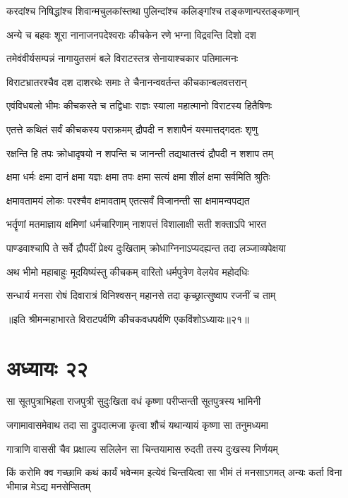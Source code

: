 \twolineshloka
{करदांश्च निषिद्धांश्च शिवान्मचुलकांस्तथा}
{पुलिन्दांश्च कलिङ्गांश्च तङ्कणान्परतङ्कणान्}


\twolineshloka
{अन्ये च बहवः शूरा नानाजनपदेश्वराः}
{कीचकेन रणे भग्ना विद्रवन्ति दिशो दश}


\twolineshloka
{तमेवंवीर्यसम्पन्नं नागायुतसमं बले}
{विराटस्तत्र सेनायाश्चकार पतिमात्मनः}


\twolineshloka
{विराटभ्रातरश्चैव दश दाशरथेः समाः}
{ते चैनानन्ववर्तन्त कीचकान्बलवत्तरान्}


\twolineshloka
{एवंविधबलो भीमः कीचकस्ते च तद्विधाः}
{राज्ञः स्याला महात्मानो विराटस्य हितैषिणः}


\twolineshloka
{एतत्ते कथितं सर्वं कीचकस्य पराक्रमम्}
{द्रौपदी न शशापैनं यस्मात्तद्गदतः शृणु}


\twolineshloka
{रक्षन्ति हि तपः क्रोधादृषयो न शपन्ति च}
{जानन्ती तद्यथातत्त्वं द्रौपदी न शशाप तम्}


\twolineshloka
{क्षमा धर्मः क्षमा दानं क्षमा यज्ञः क्षमा तपः}
{क्षमा सत्यं क्षमा शीलं क्षमा सर्वमिति श्रुतिः}


\twolineshloka
{क्षमावतामयं लोकः परश्चैव क्षमावताम्}
{एतत्सर्वं विजानन्ती सा क्षमामन्वपद्यत}


\twolineshloka
{भर्तॄणां मतमाज्ञाय क्षमिणां धर्मचारिणाम्}
{नाशपत्तं विशालाक्षी सती शक्ताऽपि भारत}


\twolineshloka
{पाण्डवाश्चापि ते सर्वे द्रौपदीं प्रेक्ष्य दुःखिताम्}
{क्रोधाग्निनाऽप्यदह्यन्त तदा लञ्जाव्यपेक्षया}


\twolineshloka
{अथ भीमो महाबाहुः मूदयिष्यंस्तु कीचकम्}
{वारितो धर्मपुत्रेण वेलयेव महोदधिः}


\twolineshloka
{सन्धार्य मनसा रोषं दिवारात्रं विनिश्वसन्}
{महानसे तदा कृच्छ्रात्सुष्वाप रजनीं च ताम्}

॥इति श्रीमन्महाभारते विराटपर्वणि कीचकवधपर्वणि एकविंशोऽध्यायः॥२१॥

\chapter{अध्यायः २२}

\twolineshloka
{सा सूतपुत्राभिहता राजपुत्री सुदुःखिता}
{वधं कृष्णा परीप्सन्ती सूतपुत्रस्य भामिनी}


\twolineshloka
{जगामावासमेवाथ तदा सा द्रुपदात्मजा}
{कृत्वा शौचं यथान्यायं कृष्णा सा तनुमध्यमा}


\twolineshloka
{गात्राणि वाससी चैव प्रक्षाल्य सलिलेन सा}
{चिन्तयामास रुदती तस्य दुःखस्य निर्णयम्}


\threelineshloka
{किं करोमि क्व गच्छामि कथं कार्यं भवेन्मम}
{इत्येवं चिन्तयित्वा सा भीमं तं मनसाऽगमत्}
{अन्यः कर्ता विना भीमान्न मेऽद्य मनसेप्सितम्}


